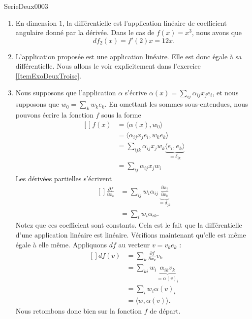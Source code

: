 
\begin{corrige}{SerieDeux0003}

	\begin{enumerate}

		\item
			En dimension $1$, la différentielle est l'application linéaire de coefficient angulaire donné par la dérivée. Dans le cas de $f(x)=x^3$, nous avons que 
			\begin{equation}
				df_2(x)=f'(2)x=12x.
			\end{equation}
		\item
			L'application proposée est une application linéaire. Elle est donc égale à sa différentielle. Nous allons le voir explicitement dans l'exercice \ref{ItemExoDeuxTroisc}.
		\item\label{ItemExoDeuxTroisc}
			Nous supposons que l'application $\alpha$ s'écrive $\alpha(x)=\sum_{ij}\alpha_{ij}x_j e_i$, et nous supposons que $w_0=\sum_kw_ke_k$. En omettant les sommes sous-entendues, nous pouvons écrire la fonction $f$ sous la forme
			\begin{equation}
				\begin{aligned}[]
					f(x)&=\langle \alpha(x),w_0\rangle\\
					&=\langle \alpha_{ij}x_j e_i,w_ke_k\rangle\\
					&=\sum_{ijk}\alpha_{ij}x_jw_k\underbrace{\langle e_i,e_k\rangle}_{=\delta_{ik}}\\
					&=\sum_{ij}\alpha_{ij}x_jw_i
				\end{aligned}
			\end{equation}
			Les dérivées partielles s'écrivent
			\begin{equation}
				\begin{aligned}[]
					\frac{ \partial f }{ \partial x_k }&=\sum_{ij}w_i\alpha_{ij}\underbrace{\frac{ \partial x_j }{ \partial x_k }}_{=\delta_{jk}}\\
					&=\sum_iw_i\alpha_{ik}.
				\end{aligned}
			\end{equation}
			Notez que ces coefficient sont constants. Cela est le fait que la différentielle d'une application linéaire est linéaire. Vérifions maintenant qu'elle est même égale à elle même. Appliquons $df$ au vecteur $v=v_ke_k$ :
			\begin{equation}
				\begin{aligned}[]
					df(v)&=\sum_k\frac{ \partial f }{ \partial x_k }v_k\\
					&=\sum_{ki}w_i\underbrace{\alpha_{ik}v_k}_{=\alpha(v)_i}\\
					&=\sum_i w_i\alpha(v)_i\\
					&=\langle w,\alpha(v)\rangle.
				\end{aligned}
			\end{equation}
			Nous retombons donc bien sur la fonction $f$ de départ.


\end{enumerate}
\end{corrige}
